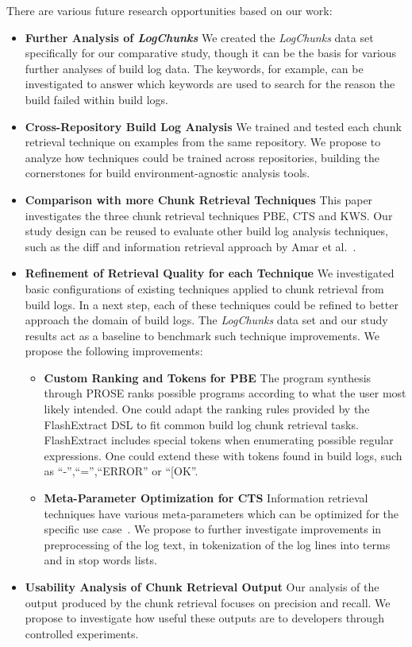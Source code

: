 There are various future research opportunities based on our work:
\begin{itemize}
  \item \textbf{Further Analysis of \emph{LogChunks}} We created the \emph{LogChunks} data set specifically for our comparative study, though it can be the basis for various further analyses of build log data.
  The keywords, for example, can be investigated to answer which keywords are used to search for the reason the build failed within build logs.
  \item \textbf{Cross-Repository Build Log Analysis} We trained and tested each chunk retrieval technique on examples from the same repository.
  We propose to analyze how techniques could be trained across repositories, building the cornerstones for build environment-agnostic analysis tools.
  \item \textbf{Comparison with more Chunk Retrieval Techniques} This paper investigates the three chunk retrieval techniques PBE, CTS and KWS\@.
  Our study design can be reused to evaluate other build log analysis techniques, such as the diff and information retrieval approach by Amar et al.~\cite{amar2019mining}.
  \item \textbf{Refinement of Retrieval Quality for each Technique} We investigated basic configurations of existing techniques applied to chunk retrieval from build logs.
  In a next step, each of these techniques could be refined to better approach the domain of build logs.
  The \emph{LogChunks} data set and our study results act as a baseline to benchmark such technique improvements.
  We propose the following improvements:
    \begin{itemize}
      \item \textbf{Custom Ranking and Tokens for PBE} The program synthesis through PROSE ranks possible programs according to what the user most likely intended.
      One could adapt the ranking rules provided by the FlashExtract DSL to fit common build log chunk retrieval tasks.
      FlashExtract includes special tokens when enumerating possible regular expressions.
      One could extend these with tokens found in build logs, such as ``-'',``='',``ERROR'' or ``[OK''.
      \item \textbf{Meta-Parameter Optimization for CTS} Information retrieval techniques have various meta-parameters which can be optimized for the specific use case~\cite{panichella2016parameterizing}.
      We propose to further investigate improvements in preprocessing of the log text, in tokenization of the log lines into terms and in stop words lists.
    \end{itemize}
  \item \textbf{Usability Analysis of Chunk Retrieval Output} Our analysis of the output produced by the chunk retrieval focuses on precision and recall.
  We propose to investigate how useful these outputs are to developers through controlled experiments.
\end{itemize}

